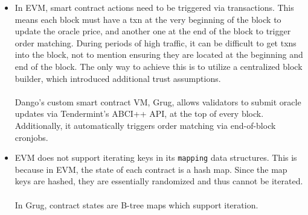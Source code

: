 \documentclass{article}
\begin{document}
\begin{itemize}
  \item In EVM, smart contract actions need to be triggered via transactions. This means each block must have a txn at the very beginning of the block to update the oracle price, and another one at the end of the block to trigger order matching. During periods of high traffic, it can be difficult to get txns into the block, not to mention ensuring they are located at the beginning and end of the block. The only way to achieve this is to utilize a centralized block builder, which introduced additional trust assumptions.\\ \\ Dango's custom smart contract VM, Grug,\supercite{grug} allows validators to submit oracle updates via Tendermint's ABCI++ API, at the top of every block. Additionally, it automatically triggers order matching via end-of-block cronjobs.\\
  \item EVM does not support iterating keys in its \texttt{mapping} data structures. This is because in EVM, the state of each contract is a hash map. Since the map keys are hashed, they are essentially randomized and thus cannot be iterated.\\ \\ In Grug, contract states are B-tree maps which support iteration.
\end{itemize}

\printbibliography
\end{document}
